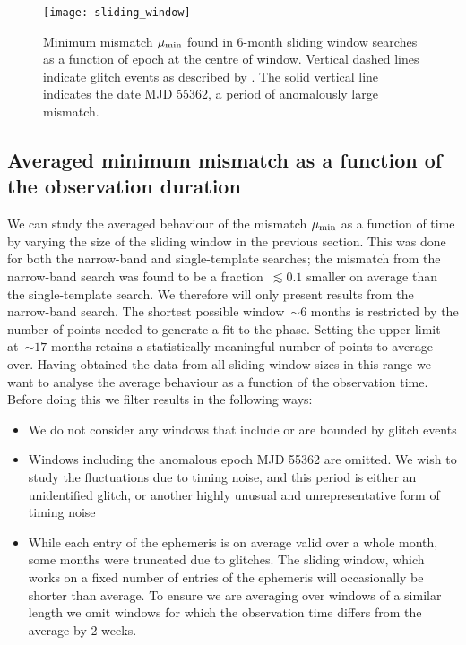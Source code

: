 \documentclass[../full_thesis/full_thesis.tex]{subfiles}
\begin{document}
\begin{figure}[htb]
\centering
\texttt{[image: sliding\_window]}
\caption{Minimum mismatch $\mu_{\mathrm{min}}$ found in 6-month sliding window searches
    as a function of epoch
     at the centre of  window.  Vertical dashed lines
    indicate glitch events as described by \citet{Espinoza2011}. The solid
    vertical line indicates the date MJD 55362, a period of anomalously
    large mismatch.}
\label{fig: sliding window}
\end{figure}



\subsection{Averaged minimum mismatch as a function of the observation duration}
\label{sec: averaged mismatch as a function of the observation duration}

We can study the averaged behaviour of the mismatch $\mu_{\mathrm{min}}$ as a function of
time by varying the size of the sliding window in the previous section. This
was done for both the narrow-band and single-template searches; the mismatch
from the narrow-band search was found to be  a fraction~$\lesssim 0.1$ smaller
on average than the single-template search. We therefore will only present
results from the narrow-band search. The shortest possible window~$\sim 6$
months is restricted by the number of points needed to generate a fit to the
phase.  Setting the upper limit at~$\sim 17$ months retains a statistically
meaningful number of points to average over. Having obtained the data from all
sliding window sizes in this range we want to analyse the average behaviour as
a function of the observation time. Before doing this we filter results in the
following ways:

\begin{itemize}
    \item We do not consider any windows that
    include or are bounded by glitch events

    \item Windows including the anomalous epoch MJD 55362 are omitted. We
    wish to study the fluctuations due to timing noise, and this
    period is either an unidentified glitch, or another highly unusual and
    unrepresentative form of timing noise

   \item While each entry of the ephemeris is on average valid over a whole
   month, some months were truncated due to glitches. The sliding window, which
   works on a fixed number of entries of the ephemeris will occasionally be
   shorter than average. To ensure we are averaging over windows of a
   similar length we omit windows for which the observation time differs from
   the average by 2 weeks.

\end{itemize}
\end{document}
